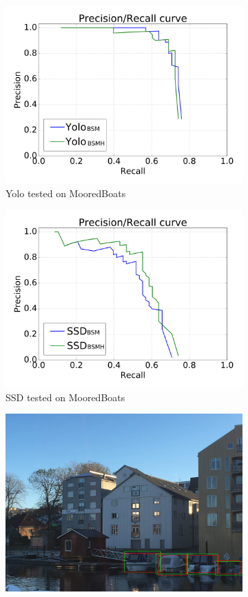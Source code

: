 \begin{figure}[h!]
\begin{subfigure}{.5\textwidth}
  \centering
  \includegraphics[width=0.8\linewidth]{results/case_buildings/prec_recall/yolo/bb-eps.png}
  \caption{Yolo tested on MooredBoats}
  \label{fig:ex_bnbb_prec_rec_yolo}
\end{subfigure}%
\begin{subfigure}{.5\textwidth}
  \centering
  \includegraphics[width=.8\linewidth]{results/case_buildings/prec_recall/ssd/bb-eps.png}
  \caption{SSD tested on MooredBoats}
  \label{fig:ex_bnbb_prec_rec_ssd}
\end{subfigure}
\begin{subfigure}{.5\textwidth}
  \centering
  \includegraphics[width=0.8\linewidth]{results/case_buildings/prec_recall/yolo/IMG_2077_bbnb.jpg}

\end{subfigure}
\end{figure}
